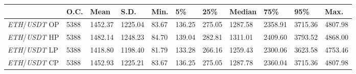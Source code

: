 \begin{tabular}{lllllllllll}
\toprule
 & \textbf{O.C.} & \textbf{Mean} & \textbf{S.D.} & \textbf{Min.} & \textbf{5\%} & \textbf{25\%} & \textbf{Median} & \textbf{75\%} & \textbf{95\%} & \textbf{Max.} \\
\midrule
\emph{ETH}/\emph{USDT} OP & 5388 & 1452.37 & 1225.04 & 83.67 & 136.25 & 275.05 & 1287.58 & 2358.91 & 3715.36 & 4807.98 \\
\emph{ETH}/\emph{USDT} HP & 5388 & 1482.14 & 1248.23 & 84.70 & 139.04 & 282.81 & 1311.01 & 2409.60 & 3793.52 & 4868.00 \\
\emph{ETH}/\emph{USDT} LP & 5388 & 1418.80 & 1198.40 & 81.79 & 133.28 & 266.16 & 1259.43 & 2300.06 & 3623.58 & 4753.46 \\
\emph{ETH}/\emph{USDT} CP & 5388 & 1452.93 & 1225.21 & 83.67 & 136.25 & 275.05 & 1287.78 & 2360.04 & 3715.36 & 4807.98 \\
\bottomrule
\end{tabular}
